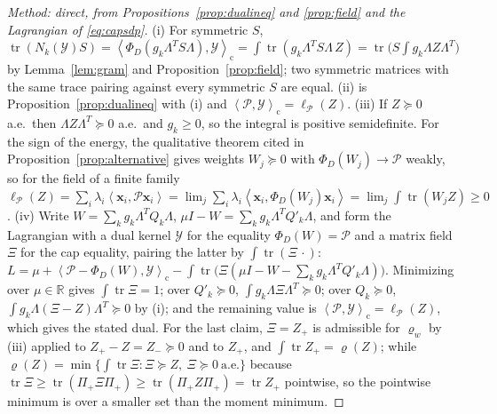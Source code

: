 \documentclass[12pt]{article}
\newcommand{\R}{\mathbb{R}}
\newcommand{\mcl}[1]{\mathcal{#1}}
\newcommand{\mbf}[1]{\mathbf{#1}}
\newcommand{\mrm}[1]{\mathrm{#1}}
\newcommand{\ip}[2]{\left\langle #1,#2\right\rangle}
\newcommand{\ipc}[2]{\left\langle #1,#2\right\rangle_{\mrm{c}}}
\DeclareMathOperator{\tr}{tr}
\theoremstyle{plain}
\theoremstyle{definition}
\theoremstyle{remark}
\begin{document}
\begin{proof}[Method: direct, from Propositions~\ref{prop:dualineq} and \ref{prop:field} and the Lagrangian of \eqref{eq:capsdp}]
(i) For symmetric $S$, $\tr(N_k(\mcl Y)S)=\ipc{\Phi_D(g_k\Lambda^TS\Lambda)}{\mcl Y}=\int\tr(g_k\Lambda^TS\Lambda\,Z)=\tr\bigl(S\int g_k\Lambda Z\Lambda^T\bigr)$ by Lemma~\ref{lem:gram} and Proposition~\ref{prop:field}; two symmetric matrices with the same trace pairing against every symmetric $S$ are equal. (ii) is Proposition~\ref{prop:dualineq} with (i) and $\ipc{\mcl P}{\mcl Y}=\ell_{\mcl P}(Z)$. (iii) If $Z\succeq0$ a.e.\ then $\Lambda Z\Lambda^T\succeq0$ a.e.\ and $g_k\ge0$, so the integral is positive semidefinite. For the sign of the energy, the qualitative theorem cited in Proposition~\ref{prop:alternative} gives weights $W_j\succeq0$ with $\Phi_D(W_j)\to\mcl P$ weakly, so for the field of a finite family $\ell_{\mcl P}(Z)=\sum_i\lambda_i\ip{\mbf x_i}{\mcl P\mbf x_i}=\lim_j\sum_i\lambda_i\ip{\mbf x_i}{\Phi_D(W_j)\mbf x_i}=\lim_j\int\tr(W_jZ)\ge0$. (iv) Write $W=\sum_kg_k\Lambda^TQ_k\Lambda$, $\mu I-W=\sum_kg_k\Lambda^TQ'_k\Lambda$, and form the Lagrangian with a dual kernel $\mcl Y$ for the equality $\Phi_D(W)=\mcl P$ and a matrix field $\Xi$ for the cap equality, pairing the latter by $\int\tr(\Xi\,\cdot)$: $L=\mu+\ipc{\mcl P-\Phi_D(W)}{\mcl Y}-\int\tr\bigl(\Xi(\mu I-W-\textstyle\sum_kg_k\Lambda^TQ'_k\Lambda)\bigr)$. Minimizing over $\mu\in\R$ gives $\int\tr\Xi=1$; over $Q'_k\succeq0$, $\int g_k\Lambda\Xi\Lambda^T\succeq0$; over $Q_k\succeq0$, $\int g_k\Lambda(\Xi-Z)\Lambda^T\succeq0$ by (i); and the remaining value is $\ipc{\mcl P}{\mcl Y}=\ell_{\mcl P}(Z)$, which gives the stated dual. For the last claim, $\Xi=Z_+$ is admissible for $\varrho_w$ by (iii) applied to $Z_+-Z=Z_-\succeq0$ and to $Z_+$, and $\int\tr Z_+=\varrho(Z)$; while $\varrho(Z)=\min\{\int\tr\Xi:\Xi\succeq Z,\ \Xi\succeq0\ \text{a.e.}\}$ because $\tr\Xi\ge\tr(\Pi_+\Xi\Pi_+)\ge\tr(\Pi_+Z\Pi_+)=\tr Z_+$ pointwise, so the pointwise minimum is over a smaller set than the moment minimum.
\end{proof}
\end{document}
